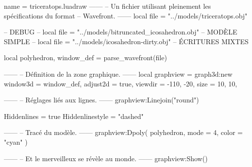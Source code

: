 \documentclass{standalone}
\begin{document}
\begin{luadraw}{name = triceratops.luadraw}
------
-- Un fichier utilisant pleinement les spécifications du format
-- Wavefront.
------
local file = "../models/triceratops.obj"

-- DEBUG
-- local file = "../models/bitruncated_icosahedron.obj" -- MODÈLE SIMPLE
-- local file = "../models/icosahedron-dirty.obj" -- ÉCRITURES MIXTES

local polyhedron, window_def = parse_wavefront(file)

------
-- Définition de la zone graphique.
------
local graphview = graph3d:new{
  window3d = window_def,
  adjust2d = true,
  viewdir  = {-110, -20},
  size     = {10, 10},
}

------
-- Réglages liés aux lignes.
------
graphview:Linejoin("round")

Hiddenlines = true
Hiddenlinestyle = "dashed"

------
-- Tracé du modèle.
------
graphview:Dpoly(
  polyhedron,
  {
    mode  = 4,
    color = "cyan"
  })

------
-- Et le merveilleux se révèle au monde.
------
graphview:Show()
\end{luadraw}
\end{document}
